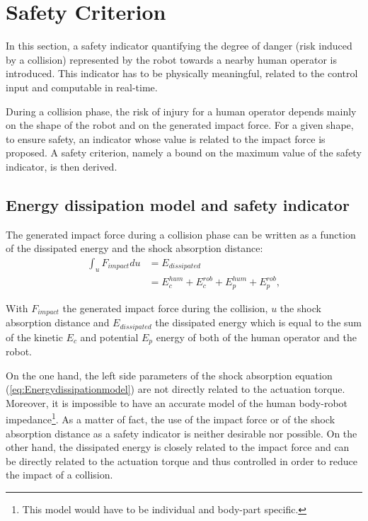 \documentclass[a4paper, 10pt, conference]{ieeeconf}      %
\begin{document}
\section{Safety Criterion}
In this section, a safety indicator quantifying the degree of danger (risk induced by a collision) represented by the robot towards a nearby human operator is introduced. This indicator has to be physically meaningful, related to the control input and computable in real-time. 

During a collision phase, the risk of injury for a human operator depends mainly on the shape of the robot and on the generated impact force. For a given shape, to ensure safety, an indicator whose value is related to the impact force is proposed. A safety criterion, namely a bound on the maximum value of the safety indicator, is then derived. 

\subsection{Energy dissipation model and safety indicator}
The generated impact force during a collision phase can be written as a function of the dissipated energy and the shock absorption distance:
\begin{equation}
\begin{split}
\int_u F_{impact} du  & = E_{dissipated} \\
                      & = E_{c}^{hum} + E_{c}^{rob} + E_{p}^{hum} + E_{p}^{rob},
\end{split}
\label{eq:Energydissipationmodel}
\end{equation}

With $ F_{impact} $ the generated impact force during the collision, $ u $ the shock absorption distance and $E_{dissipated}$ the dissipated energy which is equal to the sum of the kinetic $E_{c}$ and potential $E_{p}$ energy of both of the human operator and the robot.  

On the one hand, the left side parameters of the shock absorption equation (\ref{eq:Energydissipationmodel}) are not directly related to the actuation torque. Moreover, it is impossible to have an accurate model of the human body-robot impedance\footnote{This model would have to be individual and body-part specific.}. As a matter of fact, the use of the impact force or of the shock absorption distance as a safety indicator is neither desirable nor possible. On the other hand, the dissipated energy is closely related to the impact force and can be directly related to the actuation torque and thus controlled in order to reduce the impact of a collision.
\end{document}
